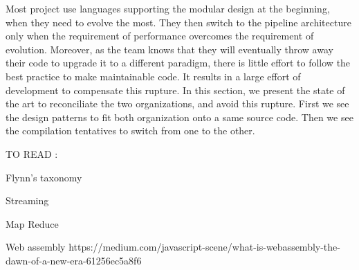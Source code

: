 Most project use languages supporting the modular design at the beginning, when they need to evolve the most.
They then switch to the pipeline architecture only when the requirement of performance overcomes the requirement of evolution.
Moreover, as the team knows that they will eventually throw away their code to upgrade it to a different paradigm, there is little effort to follow the best practice to make maintainable code.
It results in a large effort of development to compensate this rupture.
In this section, we present the state of the art to reconciliate the two organizations, and avoid this rupture.
First we see the design patterns to fit both organization onto a same source code.
Then we see the compilation tentatives to switch from one to the other.










TO READ :

Flynn's taxonomy
\cite{Flynn1972}

Streaming
\cite{Madsen2015}
\cite{Sun2015}

Map Reduce
\cite{Yao2015}


Web assembly
https://medium.com/javascript-scene/what-is-webassembly-the-dawn-of-a-new-era-61256ec5a8f6